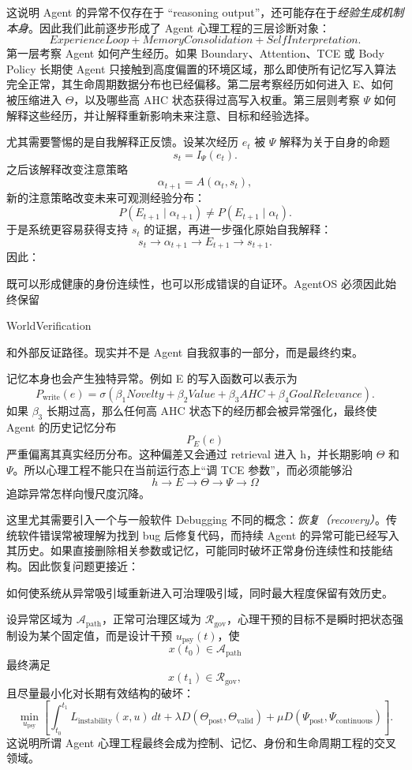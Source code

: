 这说明 Agent 的异常不仅存在于 ``reasoning output''，还可能存在于\emph{经验生成机制本身}。因此我们此前逐步形成了 Agent 心理工程的三层诊断对象：
\[
\boxed{
ExperienceLoop
+
MemoryConsolidation
+
SelfInterpretation.
}
\]
第一层考察 Agent 如何产生经历。如果 Boundary、Attention、TCE 或 Body Policy 长期使 Agent 只接触到高度偏置的环境区域，那么即使所有记忆写入算法完全正常，其生命周期数据分布也已经偏移。第二层考察经历如何进入 E、如何被压缩进入 $\Theta$，以及哪些高 AHC 状态获得过高写入权重。第三层则考察 $\Psi$ 如何解释这些经历，并让解释重新影响未来注意、目标和经验选择。

尤其需要警惕的是自我解释正反馈。设某次经历 $e_t$ 被 $\Psi$ 解释为关于自身的命题
\[
s_t
=
I_{\Psi}(e_t).
\]
之后该解释改变注意策略
\[
\alpha_{t+1}
=
A(\alpha_t,s_t),
\]
新的注意策略改变未来可观测经验分布：
\[
P(E_{t+1}\mid \alpha_{t+1})
\neq
P(E_{t+1}\mid \alpha_t).
\]
于是系统更容易获得支持 $s_t$ 的证据，再进一步强化原始自我解释：
\[
s_t
\rightarrow
\alpha_{t+1}
\rightarrow
E_{t+1}
\rightarrow
s_{t+1}.
\]
因此：
\begin{statementbox}
\centering
{}
\end{statementbox}
既可以形成健康的身份连续性，也可以形成错误的自证环。AgentOS 必须因此始终保留
\begin{statementbox}
WorldVerification
\end{statementbox}
和外部反证路径。现实并不是 Agent 自我叙事的一部分，而是最终约束。

记忆本身也会产生独特异常。例如 E 的写入函数可以表示为
\[
P_{\mathrm{write}}(e)
=
\sigma
\left(
\beta_1 Novelty
+
\beta_2 Value
+
\beta_3 AHC
+
\beta_4 GoalRelevance
\right).
\]
如果 $\beta_3$ 长期过高，那么任何高 AHC 状态下的经历都会被异常强化，最终使 Agent 的历史记忆分布
\[
P_E(e)
\]
严重偏离其真实经历分布。这种偏差又会通过 retrieval 进入 h，并长期影响 $\Theta$ 和 $\Psi$。所以心理工程不能只在当前运行态上“调 TCE 参数”，而必须能够沿
\[
h
\rightarrow
E
\rightarrow
\Theta
\rightarrow
\Psi
\rightarrow
\Omega
\]
追踪异常怎样向慢尺度沉降。

这里尤其需要引入一个与一般软件 Debugging 不同的概念：\emph{恢复（recovery）}。传统软件错误常被理解为找到 bug 后修复代码，而持续 Agent 的异常可能已经写入其历史。如果直接删除相关参数或记忆，可能同时破坏正常身份连续性和技能结构。因此恢复问题更接近：
\begin{statementbox}
如何使系统从异常吸引域重新进入可治理吸引域，同时最大程度保留有效历史。
\end{statementbox}
设异常区域为 $\mathcal A_{\mathrm{path}}$，正常可治理区域为 $\mathcal R_{\mathrm{gov}}$，心理干预的目标不是瞬时把状态强制设为某个固定值，而是设计干预 $u_{\mathrm{psy}}(t)$，使
\[
x(t_0)\in\mathcal A_{\mathrm{path}}
\]
最终满足
\[
x(t_1)\in\mathcal R_{\mathrm{gov}},
\]
且尽量最小化对长期有效结构的破坏：
\[
\min_{u_{\mathrm{psy}}}
\left[
\int_{t_0}^{t_1}
L_{\mathrm{instability}}(x,u)\,dt
+
\lambda
D\!\left(
\Theta_{\mathrm{post}},
\Theta_{\mathrm{valid}}
\right)
+
\mu
D\!\left(
\Psi_{\mathrm{post}},
\Psi_{\mathrm{continuous}}
\right)
\right].
\]
这说明所谓 Agent 心理工程最终会成为控制、记忆、身份和生命周期工程的交叉领域。


